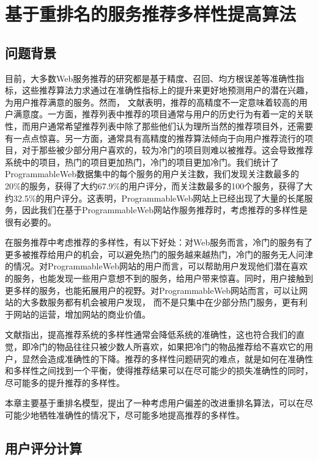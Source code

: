 \documentclass[master,winfonts]{njuthesis}
\begin{document}
\chapter{基于重排名的服务推荐多样性提高算法}\label{chapter_scalefree}
\section{问题背景}
目前，大多数Web服务推荐的研究都是基于精度、召回、均方根误差等准确性指标，这些推荐算法力求通过在准确性指标上的提升来更好地预测用户的潜在兴趣，为用户推荐满意的服务。然而， 文献\cite{Cremonesi2011Looking}表明，推荐的高精度不一定意味着较高的用户满意度。一方面，推荐列表中推荐的项目通常与用户的历史行为有着一定的关联性，而用户通常希望推荐列表中除了那些他们认为理所当然的推荐项目外，还需要有一点点惊喜。另一方面，通常具有高精度的推荐算法倾向于向用户推荐流行的项目，对于那些被少部分用户喜欢的，较为冷门的项目则难以被推荐。这会导致推荐系统中的项目，热门的项目更加热门，冷门的项目更加冷门。我们统计了ProgrammableWeb数据集中的每个服务的用户关注数，我们发现关注数最多的20\%的服务，获得了大约67.9\%的用户评分，而关注数最多的100个服务，获得了大约32.5\%的用户评分。这表明，ProgrammableWeb网站上已经出现了大量的长尾服务\cite{Anderson2006The,Levy2010Music}，因此我们在基于ProgrammableWeb网站作服务推荐时，考虑推荐的多样性是很有必要的。

在服务推荐中考虑推荐的多样性，有以下好处：对Web服务而言，冷门的服务有了更多被推荐给用户的机会，可以避免热门的服务越来越热门，冷门的服务无人问津的情况。对ProgrammableWeb网站的用户而言，可以帮助用户发现他们潜在喜欢的服务，也能发现一些用户意想不到的服务，给用户带来惊喜。同时，用户接触到更多样的服务，也能拓展用户的视野\cite{Cheng2017Learning}。对ProgrammableWeb网站而言，可以让网站的大多数服务都有机会被用户发现， 而不是只集中在少部分热门服务，更有利于网站的运营，增加网站的商业价值。

文献\cite{Zhou2010Solving}指出，提高推荐系统的多样性通常会降低系统的准确性，这也符合我们的直觉，即冷门的物品往往只被少数人所喜欢，如果把冷门的物品推荐给不喜欢它的用户，显然会造成准确性的下降。推荐的多样性问题研究的难点，就是如何在准确性和多样性之间找到一个平衡，使得推荐结果可以在尽可能少的损失准确性的同时，尽可能多的提升推荐的多样性。

本章主要基于重排名模型，提出了一种考虑用户偏差的改进重排名算法，可以在尽可能少地牺牲准确性的情况下，尽可能多地提高推荐的多样性。

\section{用户评分计算}
\end{document}
